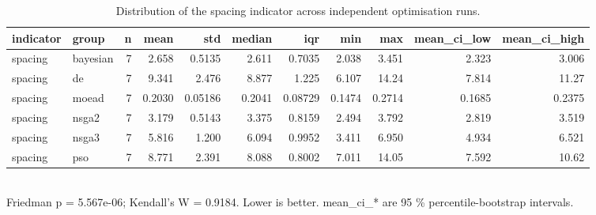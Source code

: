 \begin{table}[!t]
\centering
\caption{Distribution of the spacing indicator across independent optimisation runs.}
\label{tab:statistics_optimizer_spacing_main}
\footnotesize
\begin{tabular}{llrrrrrrrrr}
\toprule
indicator & group & n & mean & std & median & iqr & min & max & mean\_ci\_low & mean\_ci\_high \\
\midrule
spacing & bayesian & 7 & 2.658 & 0.5135 & 2.611 & 0.7035 & 2.038 & 3.451 & 2.323 & 3.006 \\
spacing & de & 7 & 9.341 & 2.476 & 8.877 & 1.225 & 6.107 & 14.24 & 7.814 & 11.27 \\
spacing & moead & 7 & 0.2030 & 0.05186 & 0.2041 & 0.08729 & 0.1474 & 0.2714 & 0.1685 & 0.2375 \\
spacing & nsga2 & 7 & 3.179 & 0.5143 & 3.375 & 0.8159 & 2.494 & 3.792 & 2.819 & 3.519 \\
spacing & nsga3 & 7 & 5.816 & 1.200 & 6.094 & 0.9952 & 3.411 & 6.950 & 4.934 & 6.521 \\
spacing & pso & 7 & 8.771 & 2.391 & 8.088 & 0.8002 & 7.011 & 14.05 & 7.592 & 10.62 \\
\bottomrule
\end{tabular}
\\[2pt] \footnotesize Friedman p = 5.567e-06; Kendall's W = 0.9184. Lower is better. mean\_ci\_* are 95 \% percentile-bootstrap intervals.
\end{table}
